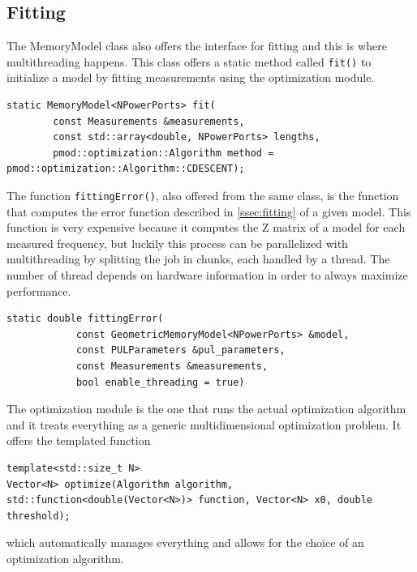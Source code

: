 \subsection{Fitting}
The MemoryModel class also offers the interface for fitting and this is where multithreading happens. This class offers a static method called \texttt{fit()} to initialize a model by fitting measurements using the optimization module.
\begin{lstlisting}
static MemoryModel<NPowerPorts> fit(
        const Measurements &measurements,
        const std::array<double, NPowerPorts> lengths,
        pmod::optimization::Algorithm method = pmod::optimization::Algorithm::CDESCENT);
\end{lstlisting}
The function \texttt{fittingError()}, also offered from the same class, is the function that computes the error function described in \autoref{ssec:fitting} of a given model. This function is very expensive because it computes the Z matrix of a model for each measured frequency, but luckily this process can be parallelized with multithreading by splitting the job in chunks, each handled by a thread. The number of thread depends on hardware information in order to always maximize performance.
\begin{lstlisting}
static double fittingError(
            const GeometricMemoryModel<NPowerPorts> &model,
            const PULParameters &pul_parameters,
            const Measurements &measurements,
            bool enable_threading = true)
\end{lstlisting}

The optimization module is the one that runs the actual optimization algorithm and it treats everything as a generic multidimensional optimization problem. It offers the templated function
\begin{lstlisting}
template<std::size_t N>
Vector<N> optimize(Algorithm algorithm, std::function<double(Vector<N>)> function, Vector<N> x0, double threshold);
\end{lstlisting}
which automatically manages everything and allows for the choice of an optimization algorithm.

